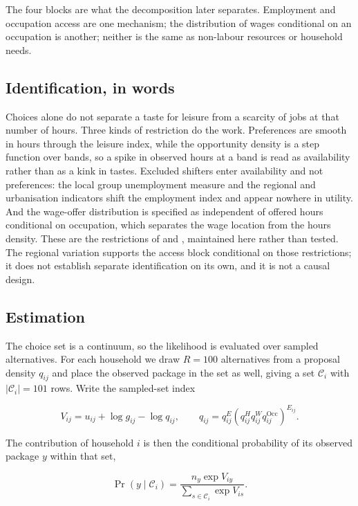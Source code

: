 The four blocks are what the decomposition later separates. Employment and occupation access are one mechanism; the distribution of wages conditional on an occupation is another; neither is the same as non-labour resources or household needs.

\subsection{Identification, in words}\label{identification-in-words}

Choices alone do not separate a taste for leisure from a scarcity of jobs at that number of hours. Three kinds of restriction do the work. Preferences are smooth in hours through the leisure index, while the opportunity density is a step function over bands, so a spike in observed hours at a band is read as availability rather than as a kink in tastes. Excluded shifters enter availability and not preferences: the local group unemployment measure and the regional and urbanisation indicators shift the employment index and appear nowhere in utility. And the wage-offer distribution is specified as independent of offered hours conditional on occupation, which separates the wage location from the hours density. These are the restrictions of \citet{capeau2016} and \citet{dagsvikjia2016}, maintained here rather than tested. The regional variation supports the access block conditional on those restrictions; it does not establish separate identification on its own, and it is not a causal design.

\subsection{Estimation}\label{estimation}

The choice set is a continuum, so the likelihood is evaluated over sampled alternatives. For each household we draw \(R=100\) alternatives from a proposal density \(q_{ij}\) and place the observed package in the set as well, giving a set \(\mathcal C_i\) with \(|\mathcal C_i|=101\) rows. Write the sampled-set index

\[
V_{ij}=u_{ij}+\log g_{ij}-\log q_{ij},
\qquad
q_{ij}=q^{E}_{ij}\left(q^{H}_{ij}q^{W}_{ij}q^{\mathrm{Occ}}_{ij}\right)^{E_{ij}} .
\]

The contribution of household \(i\) is then the conditional probability of its observed package \(y\) within that set,

\[
\Pr\!\left(y\mid\mathcal C_i\right)=
\frac{n_{y}\exp V_{iy}}{\sum_{s\in\mathcal C_i}\exp V_{is}} .
\]

